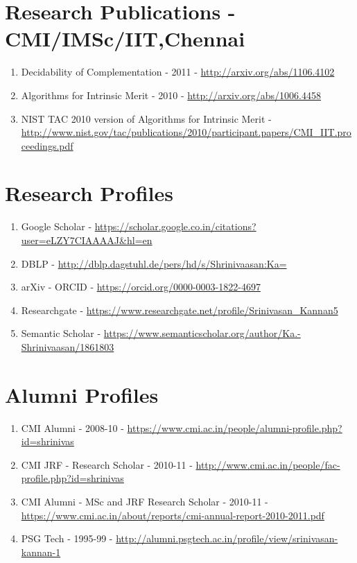 \documentclass[11pt,onecolumn]{article}
\begin{document}
\section{Research Publications - CMI/IMSc/IIT,Chennai}
\begin{enumerate}
\item[$\bullet$] Decidability of Complementation - 2011 - \url {http://arxiv.org/abs/1106.4102}
\item[$\bullet$] Algorithms for Intrinsic Merit - 2010 - \url {http://arxiv.org/abs/1006.4458}
\item[$\bullet$] NIST TAC 2010 version of Algorithms for Intrinsic Merit - \\
 \url {http://www.nist.gov/tac/publications/2010/participant.papers/CMI_IIT.proceedings.pdf}
\end{enumerate}

\section{Research Profiles}
\begin{enumerate}
\item[$\bullet$] Google Scholar - \url {https://scholar.google.co.in/citations?user=eLZY7CIAAAAJ&hl=en }
\item[$\bullet$] DBLP - \url {http://dblp.dagstuhl.de/pers/hd/s/Shrinivaasan:Ka=}
\item[$\bullet$] arXiv - ORCID - \url {https://orcid.org/0000-0003-1822-4697}
\item[$\bullet$] Researchgate - \url {https://www.researchgate.net/profile/Srinivasan_Kannan5}
\item[$\bullet$] Semantic Scholar - \url {https://www.semanticscholar.org/author/Ka.-Shrinivaasan/1861803}
\end{enumerate}

\section{Alumni Profiles}
\begin{enumerate}
\item[$\bullet$] CMI Alumni - 2008-10 - \url {https://www.cmi.ac.in/people/alumni-profile.php?id=shrinivas}
\item[$\bullet$] CMI JRF - Research Scholar - 2010-11 - \url {http://www.cmi.ac.in/people/fac-profile.php?id=shrinivas}
\item[$\bullet$] CMI Alumni - MSc and JRF Research Scholar - 2010-11 - \url {https://www.cmi.ac.in/about/reports/cmi-annual-report-2010-2011.pdf}
\item[$\bullet$] PSG Tech - 1995-99 - \url {http://alumni.psgtech.ac.in/profile/view/srinivasan-kannan-1}
\end{enumerate}
\end{document}
